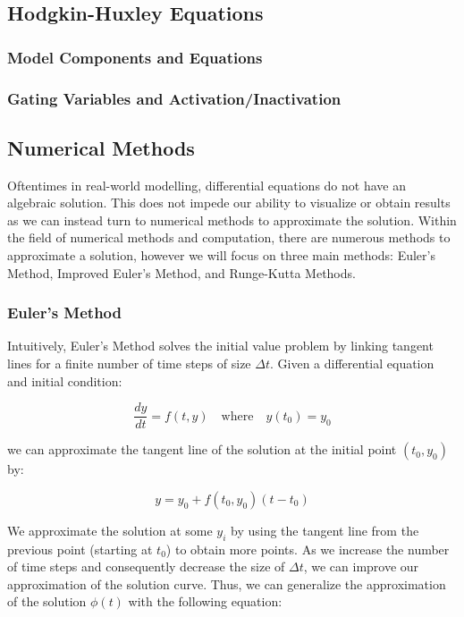 \documentclass{article} %
\begin{document}
\begin{multicols}{2}
\subsection{Hodgkin-Huxley Equations}
\label{subsec:hodgekin_huxley}
\subsubsection{Model Components and Equations}
\label{subsubsec:hh_equations}
\subsubsection{Gating Variables and Activation/Inactivation}
\label{subsubsec:gating_variables}

\subsection{Numerical Methods}
\label{subsec:numerical_methods}

Oftentimes in real-world modelling, differential equations do not have an algebraic solution.
This does not impede our ability to visualize or obtain results as we can instead turn to numerical methods to approximate the solution.
Within the field of numerical methods and computation, there are numerous methods to approximate a solution, however we will focus on three main methods: Euler's Method, Improved Euler's Method, and Runge-Kutta Methods.

\subsubsection{Euler's Method}
\label{subsubsec:euler_method}

Intuitively, Euler's Method solves the initial value problem by linking tangent lines for a finite number of time steps of size $\Delta t$.
Given a differential equation and initial condition:

\[
    \frac{dy}{dt} = f(t, y) \quad \text{where} \quad y(t_{0}) = y_{0}
\]

we can approximate the tangent line of the solution at the initial point $(t_{0}, y_{0})$ by:

\[
    y = y_{0} + f(t_{0}, y_{0})(t - t_{0})
\]

We approximate the solution at some $y_{i}$ by using the tangent line from the previous point (starting at $t_{0}$) to obtain more points.
As we increase the number of time steps and consequently decrease the size of $\Delta t$, we can improve our approximation of the solution curve.
Thus, we can generalize the approximation of the solution $\phi(t)$ with the following equation:


\end{multicols}
\end{document}
